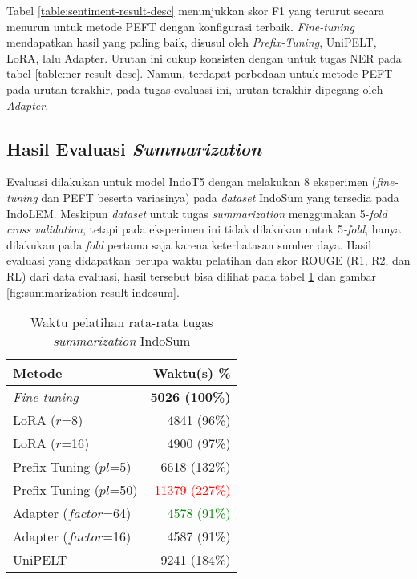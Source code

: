 Tabel \ref{table:sentiment-result-desc} menunjukkan skor F1 yang terurut secara menurun untuk metode PEFT dengan konfigurasi terbaik. \textit{Fine-tuning} mendapatkan hasil yang paling baik, disusul oleh \textit{Prefix-Tuning}, UniPELT, LoRA, lalu Adapter. Urutan ini cukup konsisten dengan untuk tugas NER pada tabel \ref{table:ner-result-desc}. Namun, terdapat perbedaan untuk metode PEFT pada urutan terakhir, pada tugas evaluasi ini, urutan terakhir dipegang oleh \textit{Adapter}.

\subsection{Hasil Evaluasi \textit{Summarization}}

Evaluasi dilakukan untuk model IndoT5 dengan melakukan 8 eksperimen (\textit{fine-tuning} dan PEFT beserta variasinya) pada \textit{dataset} IndoSum yang tersedia pada IndoLEM. Meskipun \textit{dataset} untuk tugas \textit{summarization} menggunakan 5-\textit{fold cross validation}, tetapi pada eksperimen ini tidak dilakukan untuk 5\textit{-fold}, hanya dilakukan pada \textit{fold} pertama saja karena keterbatasan sumber daya. Hasil evaluasi yang didapatkan berupa waktu pelatihan dan skor ROUGE (R1, R2, dan RL) dari data evaluasi, hasil tersebut bisa dilihat pada tabel \ref{table:runtime-summarization-indosum} dan gambar \ref{fig:summarization-result-indosum}.

\begin{table}[h]
    \centering
    \caption{Waktu pelatihan rata-rata tugas \textit{summarization} IndoSum}
    \label{table:runtime-summarization-indosum}
    \begin{tabular}{l|r}
        \toprule
        \textbf{Metode} & \textbf{Waktu(s) \%} \\
        \midrule
        \textit{Fine-tuning} & \textbf{5026 (100\%)} \\
        LoRA ($r$=8) & 4841 (96\%) \\
        LoRA ($r$=16) & 4900 (97\%) \\
        Prefix Tuning ($pl$=5) & 6618 (132\%) \\
        Prefix Tuning ($pl$=50) & \textcolor{Red}{11379 (227\%)} \\
        Adapter ($factor$=64) & \textcolor{Green}{4578 (91\%)} \\
        Adapter ($factor$=16) & 4587 (91\%) \\
        UniPELT & 9241 (184\%) \\
        \bottomrule
    \end{tabular}
\end{table}

